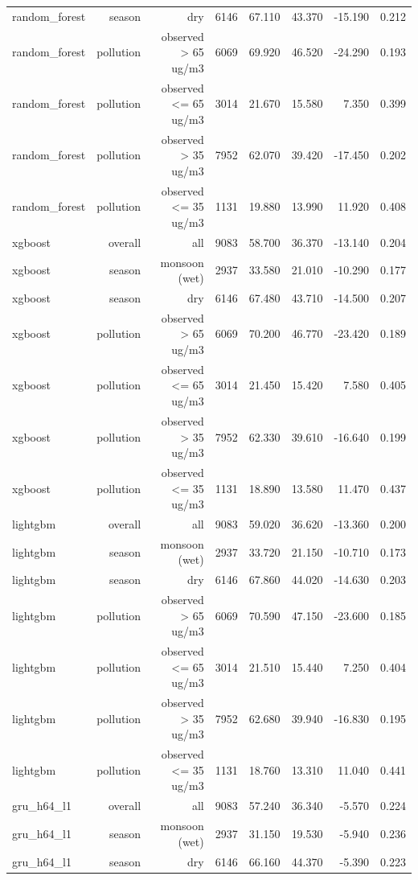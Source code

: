 \begin{table}[htbp]
\begin{tabular}{lrrrrrrr}
random\_forest & season & dry & 6146 & 67.110 & 43.370 & -15.190 & 0.212 \\
random\_forest & pollution & observed > 65 ug/m3 & 6069 & 69.920 & 46.520 & -24.290 & 0.193 \\
random\_forest & pollution & observed <= 65 ug/m3 & 3014 & 21.670 & 15.580 & 7.350 & 0.399 \\
random\_forest & pollution & observed > 35 ug/m3 & 7952 & 62.070 & 39.420 & -17.450 & 0.202 \\
random\_forest & pollution & observed <= 35 ug/m3 & 1131 & 19.880 & 13.990 & 11.920 & 0.408 \\
xgboost & overall & all & 9083 & 58.700 & 36.370 & -13.140 & 0.204 \\
xgboost & season & monsoon (wet) & 2937 & 33.580 & 21.010 & -10.290 & 0.177 \\
xgboost & season & dry & 6146 & 67.480 & 43.710 & -14.500 & 0.207 \\
xgboost & pollution & observed > 65 ug/m3 & 6069 & 70.200 & 46.770 & -23.420 & 0.189 \\
xgboost & pollution & observed <= 65 ug/m3 & 3014 & 21.450 & 15.420 & 7.580 & 0.405 \\
xgboost & pollution & observed > 35 ug/m3 & 7952 & 62.330 & 39.610 & -16.640 & 0.199 \\
xgboost & pollution & observed <= 35 ug/m3 & 1131 & 18.890 & 13.580 & 11.470 & 0.437 \\
lightgbm & overall & all & 9083 & 59.020 & 36.620 & -13.360 & 0.200 \\
lightgbm & season & monsoon (wet) & 2937 & 33.720 & 21.150 & -10.710 & 0.173 \\
lightgbm & season & dry & 6146 & 67.860 & 44.020 & -14.630 & 0.203 \\
lightgbm & pollution & observed > 65 ug/m3 & 6069 & 70.590 & 47.150 & -23.600 & 0.185 \\
lightgbm & pollution & observed <= 65 ug/m3 & 3014 & 21.510 & 15.440 & 7.250 & 0.404 \\
lightgbm & pollution & observed > 35 ug/m3 & 7952 & 62.680 & 39.940 & -16.830 & 0.195 \\
lightgbm & pollution & observed <= 35 ug/m3 & 1131 & 18.760 & 13.310 & 11.040 & 0.441 \\
gru\_h64\_l1 & overall & all & 9083 & 57.240 & 36.340 & -5.570 & 0.224 \\
gru\_h64\_l1 & season & monsoon (wet) & 2937 & 31.150 & 19.530 & -5.940 & 0.236 \\
gru\_h64\_l1 & season & dry & 6146 & 66.160 & 44.370 & -5.390 & 0.223 \\

\end{tabular}
\end{table}
